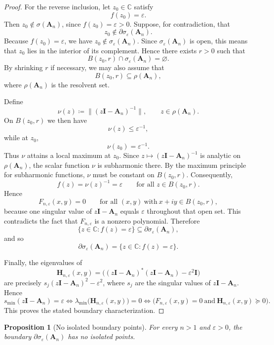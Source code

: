 \documentclass[11pt]{article}
\newtheorem{proposition}[theorem]{Proposition}
\begin{document}
\begin{proof}
For the reverse inclusion, let \(z_0\in\mathbb{C}\) satisfy
\[
f(z_0)=\varepsilon.
\]
Then \(z_0\notin \sigma(\mathbf{A}_n)\), since \(f(z_0)=\varepsilon>0\).
Suppose, for contradiction, that
\[
z_0\notin \partial\sigma_\varepsilon(\mathbf{A}_n).
\]
Because \(f(z_0)=\varepsilon\), we have \(z_0\notin \sigma_\varepsilon(\mathbf{A}_n)\).
Since \(\sigma_\varepsilon(\mathbf{A}_n)\) is open, this means that \(z_0\) lies in the interior of its complement.
Hence there exists \(r>0\) such that
\[
B(z_0,r)\cap \sigma_\varepsilon(\mathbf{A}_n)=\varnothing.
\]
By shrinking \(r\) if necessary, we may also assume that
\[
B(z_0,r)\subseteq \rho(\mathbf{A}_n),
\]
where \(\rho(\mathbf{A}_n)\) is the resolvent set.

Define
\[
\nu(z)\coloneqq \|(z\mathbf{I}-\mathbf{A}_n)^{-1}\|,
\qquad z\in \rho(\mathbf{A}_n).
\]
On \(B(z_0,r)\) we then have
\[
\nu(z)\le \varepsilon^{-1},
\]
while at \(z_0\),
\[
\nu(z_0)=\varepsilon^{-1}.
\]
Thus \(\nu\) attains a local maximum at \(z_0\).
Since \(z\mapsto (z\mathbf{I}-\mathbf{A}_n)^{-1}\) is analytic on \(\rho(\mathbf{A}_n)\),
the scalar function \(\nu\) is subharmonic there. By the maximum principle for subharmonic functions,
\(\nu\) must be constant on \(B(z_0,r)\). Consequently,
\[
f(z)=\nu(z)^{-1}=\varepsilon
\qquad \text{for all } z\in B(z_0,r).
\]
Hence
\[
F_{n,\varepsilon}(x,y)=0
\qquad \text{for all } (x,y)\ \text{with}\ x+iy\in B(z_0,r),
\]
because one singular value of \(z\mathbf{I}-\mathbf{A}_n\) equals \(\varepsilon\) throughout that open set.
This contradicts the fact that \(F_{n,\varepsilon}\) is a nonzero polynomial.
Therefore
\[
\{z\in\mathbb{C}:f(z)=\varepsilon\}\subseteq \partial\sigma_\varepsilon(\mathbf{A}_n),
\]
and so
\[
\partial\sigma_\varepsilon(\mathbf{A}_n)=\{z\in\mathbb{C}:f(z)=\varepsilon\}.
\]

Finally, the eigenvalues of
\[
\mathbf{H}_{n,\varepsilon}(x,y)
=\bigl((z\mathbf{I}-\mathbf{A}_n)^*(z\mathbf{I}-\mathbf{A}_n)-\varepsilon^2\mathbf{I}\bigr)
\]
are precisely \(s_j(z\mathbf{I}-\mathbf{A}_n)^2-\varepsilon^2\), where \(s_j\) are the singular values
of \(z\mathbf{I}-\mathbf{A}_n\). Hence
\[
s_{\min}(z\mathbf{I}-\mathbf{A}_n)=\varepsilon
\iff
\lambda_{\min}\bigl(\mathbf{H}_{n,\varepsilon}(x,y)\bigr)=0
\iff
\bigl(F_{n,\varepsilon}(x,y)=0\ \text{and}\ \mathbf{H}_{n,\varepsilon}(x,y)\succeq 0\bigr).
\]
This proves the stated boundary characterization.
\end{proof}

\begin{proposition}[No isolated boundary points]\label{prop:no-isolated-boundary-points}
For every \(n>1\) and \(\varepsilon>0\), the boundary \(\partial\sigma_\varepsilon(\mathbf{A}_n)\) has no isolated points.
\end{proposition}
\end{document}
